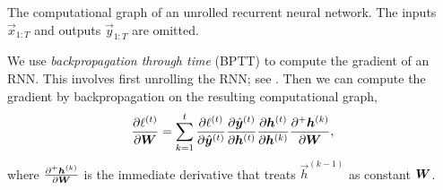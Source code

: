 \begin{marginfigure}[2cm]
    \centering
    \caption{The computational graph of an unrolled recurrent neural network. The inputs $\vec{x}_{1:T}$ and outputs $\vec{y}_{1:T}$ are omitted.}
    \label{fig:rnn}
\end{marginfigure}

We use \textit{backpropagation through time} (BPTT) to compute the gradient of an RNN. This
involves first unrolling the RNN; see . Then we can compute the gradient by
backpropagation on the resulting computational graph, \[
    \pdv{\ell^{(t)}}{\bm{W}} = \sum_{k=1}^{t} \pdv{\ell^{(t)}}{\hat{\bm{y}}^{(t)}} \pdv{\hat{\bm{y}}^{(t)}}{\bm{h}^{(t)}} \pdv{\bm{h}^{(t)}}{\bm{h}^{(k)}} \pdv{^+ \bm{h}^{(k)}}{\bm{W}},
\]
where $\pdv{^+ \bm{h}^{(k)}}{\bm{W}}$ is the immediate derivative that treats $\vec{h}^{(k-1)}$
as constant \wrt $\bm{W}$.


